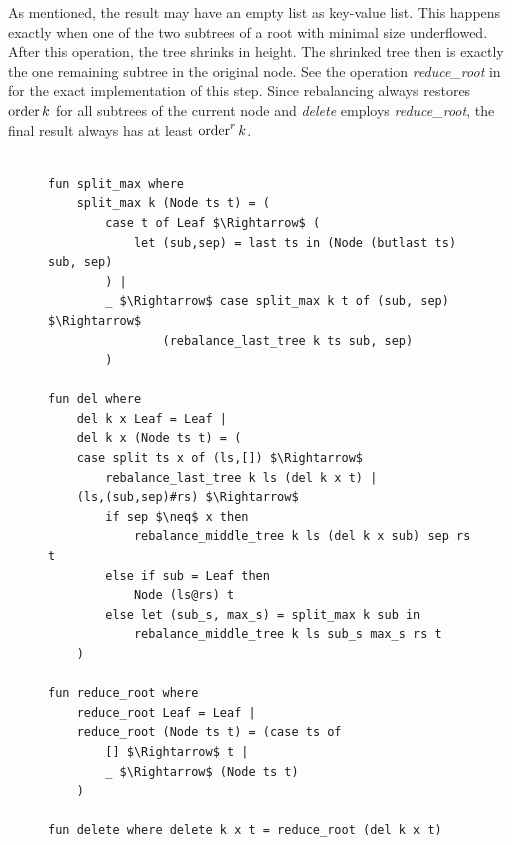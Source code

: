 As mentioned, the result may have an empty list as key-value list.
This happens exactly when one of the two subtrees of a root
with minimal size underflowed.
After this operation, the tree shrinks in height.
The shrinked tree then is exactly the one remaining subtree in the original node.
See the operation \textit{reduce\_root} in  for the exact implementation
of this step.
Since rebalancing always restores $\operatorname{order} k$ for all subtrees
of the current node and \textit{delete} employs \textit{reduce\_root},
the final result always has at least $\operatorname{order}^r k$.


\begin{figure}
\begin{lstlisting}[mathescape=true, language=Isabelle,label={lst:del-def},
    caption={The $delete$ function}]

fun split_max where
    split_max k (Node ts t) = (
        case t of Leaf $\Rightarrow$ (
            let (sub,sep) = last ts in (Node (butlast ts) sub, sep)
        ) |
        _ $\Rightarrow$ case split_max k t of (sub, sep) $\Rightarrow$
                (rebalance_last_tree k ts sub, sep)
        )

fun del where
    del k x Leaf = Leaf |
    del k x (Node ts t) = (
    case split ts x of (ls,[]) $\Rightarrow$
        rebalance_last_tree k ls (del k x t) |
    (ls,(sub,sep)#rs) $\Rightarrow$
        if sep $\neq$ x then
            rebalance_middle_tree k ls (del k x sub) sep rs t
        else if sub = Leaf then
            Node (ls@rs) t
        else let (sub_s, max_s) = split_max k sub in
            rebalance_middle_tree k ls sub_s max_s rs t
    )
 
fun reduce_root where
    reduce_root Leaf = Leaf |
    reduce_root (Node ts t) = (case ts of
        [] $\Rightarrow$ t |
        _ $\Rightarrow$ (Node ts t)
    )
 
fun delete where delete k x t = reduce_root (del k x t)
\end{lstlisting}
\end{figure}

